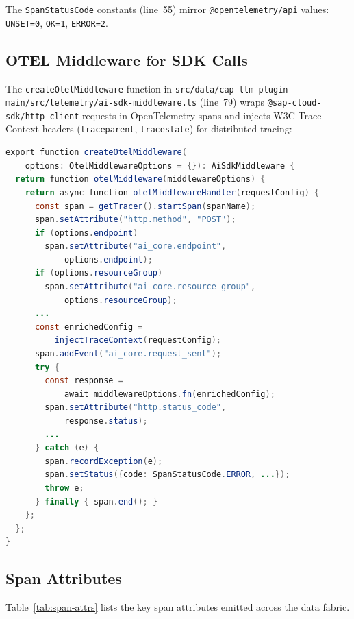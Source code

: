\documentclass[11pt]{article}
\newcommand{\filepath}[1]{\texttt{#1}}
\newcommand{\code}[1]{\texttt{#1}}
\begin{document}
The \code{SpanStatusCode} constants (line~55) mirror \code{@opentelemetry/api}
values: \code{UNSET=0}, \code{OK=1}, \code{ERROR=2}.

\subsection{OTEL Middleware for SDK Calls}

The \code{createOtelMiddleware} function in
\filepath{src/data/cap-llm-plugin-main/src/telemetry/ai-sdk-middleware.ts}
(line~79) wraps \code{@sap-cloud-sdk/http-client} requests in
OpenTelemetry spans and injects W3C Trace Context headers
(\code{traceparent}, \code{tracestate}) for distributed tracing:

\begin{lstlisting}[language=Java,caption={OTEL middleware (ai-sdk-middleware.ts lines 79--143)},label=lst:otel-mw]
export function createOtelMiddleware(
    options: OtelMiddlewareOptions = {}): AiSdkMiddleware {
  return function otelMiddleware(middlewareOptions) {
    return async function otelMiddlewareHandler(requestConfig) {
      const span = getTracer().startSpan(spanName);
      span.setAttribute("http.method", "POST");
      if (options.endpoint)
        span.setAttribute("ai_core.endpoint",
            options.endpoint);
      if (options.resourceGroup)
        span.setAttribute("ai_core.resource_group",
            options.resourceGroup);
      ...
      const enrichedConfig =
          injectTraceContext(requestConfig);
      span.addEvent("ai_core.request_sent");
      try {
        const response =
            await middlewareOptions.fn(enrichedConfig);
        span.setAttribute("http.status_code",
            response.status);
        ...
      } catch (e) {
        span.recordException(e);
        span.setStatus({code: SpanStatusCode.ERROR, ...});
        throw e;
      } finally { span.end(); }
    };
  };
}
\end{lstlisting}

\subsection{Span Attributes}

Table~\ref{tab:span-attrs} lists the key span attributes emitted
across the data fabric.
\end{document}
